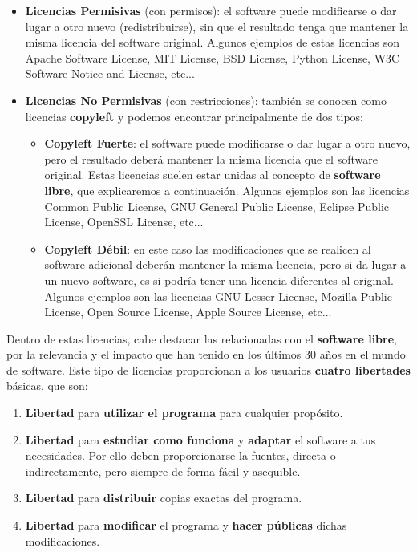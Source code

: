 \begin{itemize}
    \item \textbf{Licencias Permisivas} (con permisos): el software puede modificarse o dar lugar a otro nuevo (redistribuirse), sin que el resultado tenga que mantener la misma licencia del software original. Algunos ejemplos de estas licencias son Apache Software License, MIT License, BSD License, Python License, W3C Software Notice and License, etc...

    \item \textbf{Licencias No Permisivas} (con restricciones): también se conocen como licencias \textbf{copyleft} y podemos encontrar principalmente de dos tipos:
    \begin{itemize}
        \item \textbf{Copyleft Fuerte}: el software puede modificarse o dar lugar a otro nuevo, pero el resultado deberá mantener la misma licencia que el software original. Estas licencias suelen estar unidas al concepto de \textbf{software libre}, que explicaremos a continuación. Algunos ejemplos son las licencias Common Public License, GNU General Public License, Eclipse Public License, OpenSSL License, etc...

        \item \textbf{Copyleft Débil}: en este caso las modificaciones que se realicen al software adicional deberán mantener la misma licencia, pero si da lugar a un nuevo software, es si podría tener una licencia diferentes al original. Algunos ejemplos son las licencias GNU Lesser License, Mozilla Public License, Open Source License, Apple Source License, etc...
    \end{itemize}
\end{itemize}

Dentro de estas licencias, cabe destacar las relacionadas con el \textbf{software libre}, por la relevancia y el impacto que han tenido en los últimos 30 años en el mundo de software. Este tipo de licencias proporcionan a los usuarios \textbf{cuatro libertades} básicas, que son:

\begin{enumerate}
    \item \textbf{Libertad} para \textbf{utilizar el programa} para cualquier propósito.
    \item \textbf{Libertad} para \textbf{estudiar como funciona} y \textbf{adaptar} el software a tus necesidades. Por ello deben proporcionarse la fuentes, directa o indirectamente, pero siempre de forma fácil y asequible.
    \item \textbf{Libertad} para \textbf{distribuir} copias exactas del programa.
    \item \textbf{Libertad} para \textbf{modificar} el programa y \textbf{hacer públicas} dichas modificaciones.
\end{enumerate}

